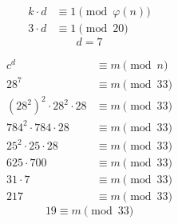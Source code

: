 \begin{align*}
    k \cdot d & \equiv 1 \pmod {\varphi(n)} \\
    3 \cdot d & \equiv 1 \pmod {20}
\end{align*}
\[
    \boxed{d = 7}
\]

\begin{align*}
    c^{d}                              & \equiv m \pmod {n}  \\
    28^{7}                             & \equiv m \pmod {33} \\
    (28^{2})^{2} \cdot 28^{2} \cdot 28 & \equiv m \pmod {33} \\
    784^{2} \cdot 784 \cdot 28         & \equiv m \pmod {33} \\
    25^{2} \cdot 25 \cdot 28           & \equiv m \pmod {33} \\
    625 \cdot 700                      & \equiv m \pmod {33} \\
    31 \cdot 7                         & \equiv m \pmod {33} \\
    217                                & \equiv m \pmod {33}
\end{align*}
\[
    \boxed{19 \equiv m \pmod {33}}
\]